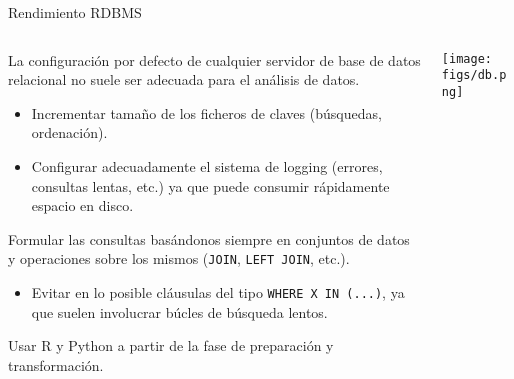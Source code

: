 \begin{frame}{Rendimiento RDBMS}
 \begin{columns}[T]
    \begin{column}{.8\textwidth}
    \begin{wideitemize}
    \item La configuración por defecto de cualquier servidor de base de datos
    relacional no suele ser adecuada para el análisis de datos.
    
    \begin{itemize}
     \item Incrementar tamaño de los ficheros de claves (búsquedas, ordenación).
     
     \item Configurar adecuadamente el sistema de logging (errores, consultas
     lentas, etc.) ya que puede consumir rápidamente espacio en disco.
     
    \end{itemize}

   \item Formular las consultas basándonos siempre en conjuntos de datos y operaciones
   sobre los mismos (\texttt{JOIN}, \texttt{LEFT JOIN}, etc.).
   
   \begin{itemize}
    \item Evitar en lo posible cláusulas del tipo \texttt{WHERE X IN (...)}, ya
    que suelen involucrar búcles de búsqueda lentos.
   \end{itemize}

   \item Usar R y Python a partir de la fase de preparación
   y transformación.
   
  \end{wideitemize}
    \end{column}
    \begin{column}{.2\textwidth}
    \vspace*{1.5cm}
    \texttt{[image: figs/db.png]}
    \end{column}
  \end{columns}

\end{frame}


